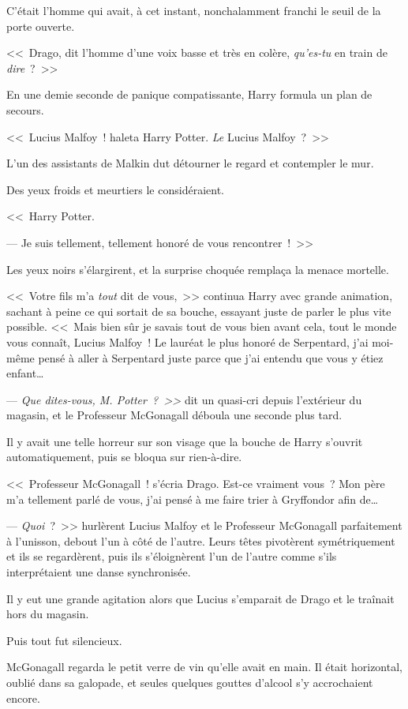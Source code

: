 C'était l'homme qui avait, à cet instant, nonchalamment franchi le seuil de la porte ouverte.

<<~Drago, dit l'homme d'une voix basse et très en colère, \emph{qu'es-tu} en train de \emph{dire}~?~>>

En une demie seconde de panique compatissante, Harry formula un plan de secours.

<<~Lucius Malfoy~! haleta Harry Potter. \emph{Le} Lucius Malfoy~?~>>

L'un des assistants de Malkin dut détourner le regard et contempler le mur.

Des yeux froids et meurtiers le considéraient.

<<~Harry Potter.

--- Je suis tellement, tellement honoré de vous rencontrer~!~>>

Les yeux noirs s'élargirent, et la surprise choquée remplaça la menace mortelle.

<<~Votre fils m'a \emph{tout} dit de vous,~>> continua Harry avec grande animation, sachant à peine ce qui sortait de sa bouche, essayant juste de parler le plus vite possible. <<~Mais bien sûr je savais tout de vous bien avant cela, tout le monde vous connaît, Lucius Malfoy~! Le lauréat le plus honoré de Serpentard, j'ai moi-même pensé à aller à Serpentard juste parce que j'ai entendu que vous y étiez enfant…

--- \emph{Que dites-vous, M. Potter~?~>>} dit un quasi-cri depuis l'extérieur du magasin, et le Professeur McGonagall déboula une seconde plus tard.

Il y avait une telle horreur sur son visage que la bouche de Harry s'ouvrit automatiquement, puis se bloqua sur rien-à-dire.

<<~Professeur McGonagall~! s'écria Drago. Est-ce vraiment vous~? Mon père m'a tellement parlé de vous, j'ai pensé à me faire trier à Gryffondor afin de…

--- \emph{Quoi}~?~>> hurlèrent Lucius Malfoy et le Professeur McGonagall parfaitement à l'unisson, debout l'un à côté de l'autre. Leurs têtes pivotèrent symétriquement et ils se regardèrent, puis ils s'éloignèrent l'un de l'autre comme s'ils interprétaient une danse synchronisée.

Il y eut une grande agitation alors que Lucius s'emparait de Drago et le traînait hors du magasin.

Puis tout fut silencieux.

McGonagall regarda le petit verre de vin qu'elle avait en main. Il était horizontal, oublié dans sa galopade, et seules quelques gouttes d'alcool s'y accrochaient encore.

